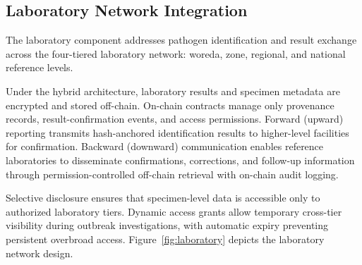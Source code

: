 \documentclass[AMA,LATO1COL]{WileyNJD-v2}
\begin{document}
%
%
%
%
%
%

\subsection{Laboratory Network Integration}\label{subsec:laboratory}

The laboratory component addresses pathogen identification and result exchange across the four-tiered laboratory network: woreda, zone, regional, and national reference levels.

Under the hybrid architecture, laboratory results and specimen metadata are encrypted and stored off-chain. On-chain contracts manage only provenance records, result-confirmation events, and access permissions. Forward (upward) reporting transmits hash-anchored identification results to higher-level facilities for confirmation. Backward (downward) communication enables reference laboratories to disseminate confirmations, corrections, and follow-up information through permission-controlled off-chain retrieval with on-chain audit logging.

Selective disclosure ensures that specimen-level data is accessible only to authorized laboratory tiers. Dynamic access grants allow temporary cross-tier visibility during outbreak investigations, with automatic expiry preventing persistent overbroad access. Figure~\ref{fig:laboratory} depicts the laboratory network design.
\end{document}
